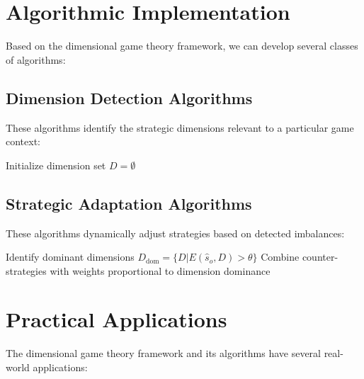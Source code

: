 \documentclass{article}
\begin{document}
\section{Algorithmic Implementation}

Based on the dimensional game theory framework, we can develop several classes of algorithms:

\subsection{Dimension Detection Algorithms}

These algorithms identify the strategic dimensions relevant to a particular game context:

\begin{algorithm}[H]
\SetAlgoLined
\caption{Dimension Identification}
Initialize dimension set $D = \emptyset$\;
\end{algorithm}

\subsection{Strategic Adaptation Algorithms}

These algorithms dynamically adjust strategies based on detected imbalances:

\begin{algorithm}[H]
\SetAlgoLined
\caption{Adaptive Response}
Identify dominant dimensions $D_{\text{dom}} = \{D | E(\hat{s}_o, D) > \theta\}$\;
Combine counter-strategies with weights proportional to dimension dominance\;
\end{algorithm}

\section{Practical Applications}

The dimensional game theory framework and its algorithms have several real-world applications:
\end{document}
